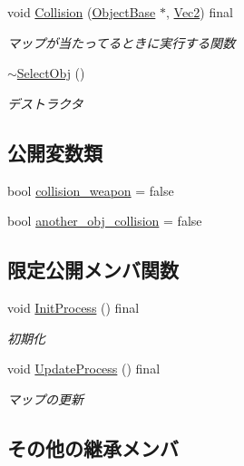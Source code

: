 \begin{DoxyCompactItemize}
void \mbox{\hyperlink{class_select_obj_a497ff683aefe9bf77201eee1e3948e15}{Collision}} (\mbox{\hyperlink{class_object_base}{Object\+Base}} $\ast$, \mbox{\hyperlink{common_8h_ae148fff5818e9444b4ab2288829559bf}{Vec2}}) final
\begin{DoxyCompactList}\small\item\em マップが当たってるときに実行する関数 \end{DoxyCompactList}\item 
\mbox{\hyperlink{class_select_obj_a091e4be751b4f828d0780acdd493fa71}{$\sim$\+Select\+Obj}} ()
\begin{DoxyCompactList}\small\item\em デストラクタ \end{DoxyCompactList}\end{DoxyCompactItemize}
\subsection*{公開変数類}
\begin{DoxyCompactItemize}
\item 
bool \mbox{\hyperlink{class_select_obj_a7678b8b51a55e9dcd2b8a003d54c08f5}{collision\+\_\+weapon}} = false
\item 
bool \mbox{\hyperlink{class_select_obj_ab3471f76e003f613f38d396ad42a7860}{another\+\_\+obj\+\_\+collision}} = false
\end{DoxyCompactItemize}
\subsection*{限定公開メンバ関数}
\begin{DoxyCompactItemize}
\item 
void \mbox{\hyperlink{class_select_obj_a09c9e1a54f4605eda5bb6e18887c2654}{Init\+Process}} () final
\begin{DoxyCompactList}\small\item\em 初期化 \end{DoxyCompactList}\item 
void \mbox{\hyperlink{class_select_obj_a4788d957629f0b69dc78166f09f949bb}{Update\+Process}} () final
\begin{DoxyCompactList}\small\item\em マップの更新 \end{DoxyCompactList}\end{DoxyCompactItemize}
\subsection*{その他の継承メンバ}


